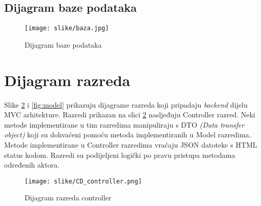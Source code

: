 			\subsection{Dijagram baze podataka}

				\begin{figure}[H]
					\texttt{[image: slike/baza.jpg]}
					\centering
					\caption{Dijagram baze podataka}
					\label{fig:baza}
				\end{figure}
			
			
			\eject
			
			
		\section{Dijagram razreda}
		
%			
%			

\quad Slike \ref{fig:controller} i \ref{fig:model} prikazuju dijagrame razreda koji pripadaju \textit{backend} dijelu MVC arhitekture. Razredi prikazan na slici \ref{fig:controller} nasljeđuju Controller razred. Neki metode implementirane u tim razredima manipuliraju s DTO \textit{(Data transfer object)} koji su dohvaćeni pomoću metoda implementiranih u Model razredima. Metode implementirane u Controller razredima vraćaju JSON datoteke s HTML status kodom. Razredi su podijeljeni logički po pravu pristupa metodama određenih aktora.

				\begin{figure}[H]
					\texttt{[image: slike/CD\_controller.png]}
					\centering
					\caption{Dijagram razreda controller}
					\label{fig:controller}
				\end{figure}
				

